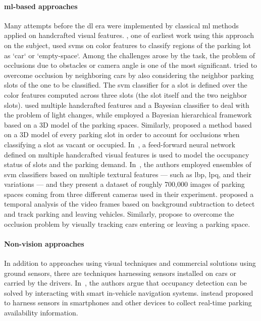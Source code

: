 \paragraph{\gls{ml}-based approaches}
Many attempts before the \gls{dl} era were implemented by classical \gls{ml} methods applied on handcrafted visual features.
\citet{dan2002parking}, one of earliest work using this approach on the subject, used \glspl{svm} on color features to classify regions of the parking lot as `car` or `empty-space`.
Among the challenges arose by the task, the problem of occlusions due to obstacles or camera angle is one of the most significant.
\citet{wu2007robust} tried to overcome occlusion by neighboring cars by also considering the neighbor parking slots of the one to be classified.
The \gls{svm} classifier for a slot is defined over the color features computed across three slots (the slot itself and the two neighbor slots).
\citet{tsai2007vehicle} used multiple handcrafted features and a Bayesian classifier to deal with the problem of light changes, while
\citet{huang2013vacant} employed a Bayesian hierarchical framework based on a 3D model of the parking spaces.
Similarly, \citet{delibaltov2013parking} proposed a method based on a 3D model of every parking slot in order to account for occlusions when classifying a slot as vacant or occupied.
In~\cite{jermsurawong2014one}, a feed-forward neural network defined on multiple handcrafted visual features is used to model the occupancy status of slots and the parking demand.
In~\cite{de2015pklot}, the authors employed ensembles of \gls{svm} classifiers based on multiple textural features --- such as \gls{lbp}, \gls{lpq}, and their variations --- and they present a dataset of roughly 700,000 images of parking spaces coming from three different cameras used in their experiment.
\citet{del2015vacant} proposed a temporal analysis of the video frames based on background subtraction to detect and track parking and leaving vehicles.
Similarly, \citet{masmoudi2014} propose to overcome the occlusion problem by visually tracking cars entering or leaving a parking space.

\paragraph{Non-vision approaches}
In addition to approaches using visual techniques and commercial solutions using ground sensors, there are techniques harnessing sensors installed on cars or carried by the drivers.
In~\cite{caicedo2012prediction}, the authors argue that occupancy detection can be solved by interacting with smart in-vehicle navigation systems.
\citet{lan2014intelligent} instead proposed to harness sensors in smartphones and other devices to collect real-time parking availability information.
%
